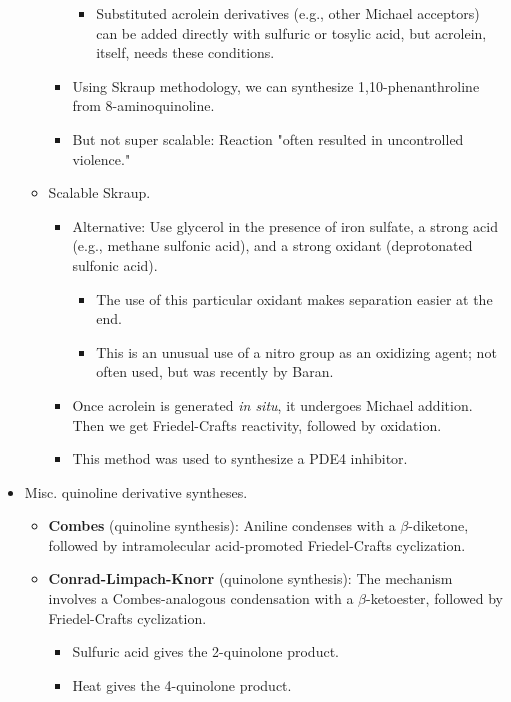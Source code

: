 \documentclass[../notes.tex]{subfiles}
\begin{document}
\begin{itemize}
\begin{itemize}
\begin{itemize}
\begin{itemize}
                \item Substituted acrolein derivatives (e.g., other Michael acceptors) can be added directly with sulfuric or tosylic acid, but acrolein, itself, needs these conditions.
            \end{itemize}
            \item Using Skraup methodology, we can synthesize 1,10-phenanthroline from 8-aminoquinoline.
            \item But not super scalable: Reaction "often resulted in uncontrolled violence."
        \end{itemize}
        \item Scalable Skraup.
        \begin{itemize}
            \item Alternative: Use glycerol in the presence of iron sulfate, a strong acid (e.g., methane sulfonic acid), and a strong oxidant (deprotonated sulfonic acid).
            \begin{itemize}
                \item The use of this particular oxidant makes separation easier at the end.
                \item This is an unusual use of a nitro group as an oxidizing agent; not often used, but was recently by Baran.
            \end{itemize}
            \item Once acrolein is generated \emph{in situ}, it undergoes Michael addition. Then we get Friedel-Crafts reactivity, followed by oxidation.
            \item This method was used to synthesize a PDE4 inhibitor.
        \end{itemize}
    \end{itemize}
    \item Misc. quinoline derivative syntheses.
    \begin{itemize}
        \item \textbf{Combes} (quinoline synthesis): Aniline condenses with a $\beta$-diketone, followed by intramolecular acid-promoted Friedel-Crafts cyclization.
        \item \textbf{Conrad-Limpach-Knorr} (quinolone synthesis): The mechanism involves a Combes-analogous condensation with a $\beta$-ketoester, followed by Friedel-Crafts cyclization.
        \begin{itemize}
            \item Sulfuric acid gives the 2-quinolone product.
            \item Heat gives the 4-quinolone product.

\end{itemize}
\end{itemize}
\end{itemize}
\end{document}
